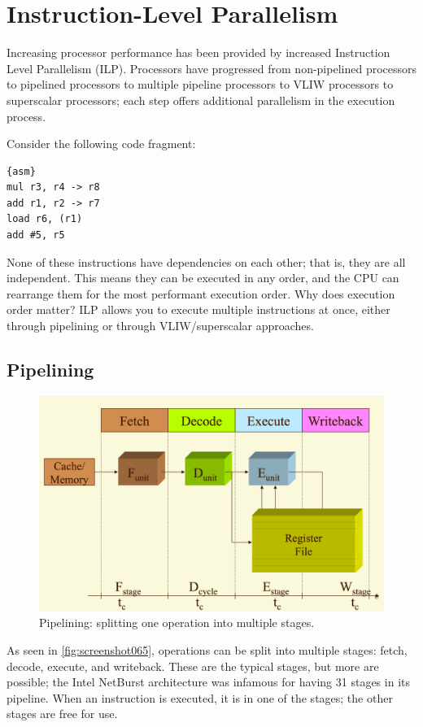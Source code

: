 \chapter{Instruction-Level Parallelism}
\label{chap:ilp}
Increasing processor performance has been provided by increased Instruction Level Parallelism (ILP). Processors have progressed from non-pipelined processors to pipelined processors to multiple pipeline processors to VLIW processors to superscalar processors; each step offers additional parallelism in the execution process.

Consider the following code fragment:
\begin{lstlisting}{asm}
mul r3, r4 -> r8
add r1, r2 -> r7
load r6, (r1)
add #5, r5
\end{lstlisting}

None of these instructions have dependencies on each other; that is, they are all independent. This means they can be executed in any order, and the CPU can rearrange them for the most performant execution order. Why does execution order matter? ILP allows you to execute multiple instructions at once, either through pipelining or through VLIW/superscalar approaches.

\section{Pipelining}
\begin{figure}
\centering
\includegraphics[width=0.7\linewidth]{screenshot065}
\caption{Pipelining: splitting one operation into multiple stages.}
\label{fig:screenshot065}
\end{figure}

As seen in \autoref{fig:screenshot065}, operations can be split into multiple stages: fetch, decode, execute, and writeback. These are the typical stages, but more are possible; the Intel NetBurst architecture was infamous for having 31 stages in its pipeline. When an instruction is executed, it is in one of the stages; the other stages are free for use. 


